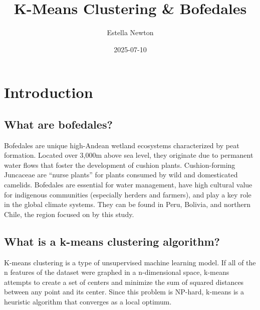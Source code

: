\documentclass[
  letterpaper,
  DIV=11,
  numbers=noendperiod]{scrreprt}
\title{K-Means Clustering \& Bofedales}
\author{Estella Newton}
\date{2025-07-10}
\renewcommand*\contentsname{Table of contents}
\newcommand\contentsname{Table of contents}
\begin{document}
\maketitle

\renewcommand*\contentsname{Table of contents}
{
\hypersetup{linkcolor=}
\setcounter{tocdepth}{2}
\tableofcontents
}


\chapter*{Introduction}\label{introduction}


\section*{What are bofedales?}\label{what-are-bofedales}


Bofedales are unique high-Andean wetland ecosystems characterized by
peat formation. Located over 3,000m above sea level, they originate due
to permanent water flows that foster the development of cushion plants.
Cushion-forming Juncaceae are ``nurse plants'' for plants consumed by
wild and domesticated camelids. Bofedales are essential for water
management, have high cultural value for indigenous communities
(especially herders and farmers), and play a key role in the global
climate systems. They can be found in Peru, Bolivia, and northern Chile,
the region focused on by this study.

\section*{What is a k-means clustering
algorithm?}\label{what-is-a-k-means-clustering-algorithm}


K-means clustering is a type of unsupervised machine learning model. If
all of the n features of the dataset were graphed in a n-dimensional
space, k-means attempts to create a set of centers and minimize the sum
of squared distances between any point and its center. Since this
problem is NP-hard, k-means is a heuristic algorithm that converges as a
local optimum.
\end{document}
